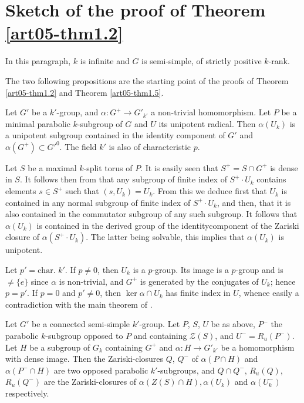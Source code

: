 \section{Sketch of the proof of Theorem \ref{art05-thm1.2}}\label{art05-sec3}

In this paragraph, $k$ is infinite and $G$ is semi-simple, of strictly positive $k$-rank.

The two following propositions are the starting point of the proofs of Theorem \ref{art05-thm1.2} and Theorem \ref{art05-thm1.5}.

\begin{proposition}\label{art05-prop3.1}
Let $G'$ be a $k'$-group, and $\alpha:G^{+}\to G'_{k'}$ a non-trivial homomorphism. Let $P$ be a minimal parabolic $k$-subgroup of $G$ and $U$ its unipotent radical. Then $\alpha(U_{k})$ is a unipotent subgroup contained in the identity component of $G'$ and $\alpha(G^{+})\subset {G'}^{0}$. The field $k'$ is also of characteristic $p$.
\end{proposition}

Let $S$ be a maximal $k$-split torus of $P$. It is easily seen that $S^{+}=S\cap G^{+}$ is dense in $S$. It follows then from \cite[\S11.1]{art05-key1} that any subgroup of finite index of $S^{+}\cdot U_{k}$ contains elements $s\in S^{+}$ such that $(s,U_{k})=U_{k}$. From this we deduce first that $U_{k}$ is contained in any normal subgroup of finite index of $S^{+}\cdot U_{k}$, and then, that it is also contained in the commutator subgroup of any such subgroup. It follows that $\alpha(U_{k})$ is contained in the derived group of the identity\pageoriginale component of the Zariski closure of $\alpha(S^{+}\cdot U_{k})$. The latter being solvable, this implies that $\alpha(U_{k})$ is unipotent.

Let $p'=\text{char.~} k'$. If $p\neq 0$, then $U_{k}$ is a $p$-group. Its image is a $p$-group and is $\neq \{e\}$ since $\alpha$ is non-trivial, and $G^{+}$ is generated by the conjugates of $U_{k}$; hence $p=p'$. If $p=0$ and $p'\neq 0$, then $\ker \alpha\cap U_{k}$ has finite index in $U$, whence easily a contradiction with the main theorem of \cite{art05-key10}.

\begin{proposition}\label{art05-prop3.2}
Let $G'$ be a connected semi-simple $k'$-group. Let $P$, $S$, $U$ be as above, $P^{-}$ the parabolic $k$-subgroup opposed to $P$ and containing $\mathscr{Z}(S)$, and $U^{-}=R_{u}(P^{-})$. Let $H$ be a subgroup of $G_{k}$ containing $G^{+}$ and $\alpha : H\to G'_{k'}$ be a homomorphism with dense image. Then the Zariski-closures $Q$, $Q^{-}$ of $\alpha(P\cap H)$ and $\alpha(P^{-}\cap H)$ are two opposed parabolic $k'$-subgroups, and $Q\cap Q^{-}$, $R_{u}(Q)$, $R_{u}(Q^{-})$ are the Zariski-closures of $\alpha(Z(S)\cap H),\alpha(U_{k})$ and $\alpha(U^{-}_{k})$ respectively.
\end{proposition}

